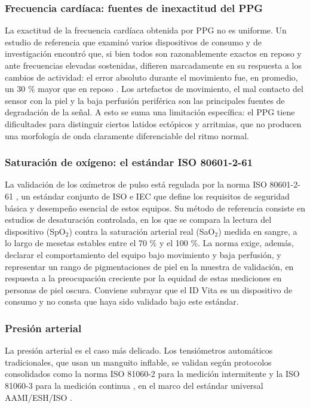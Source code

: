 \subsubsection{Frecuencia cardíaca: fuentes de inexactitud del PPG}
La exactitud de la frecuencia cardíaca obtenida por PPG no es uniforme. Un estudio de referencia que examinó varios dispositivos de consumo y de investigación encontró que, si bien todos son razonablemente exactos en reposo y ante frecuencias elevadas sostenidas, difieren marcadamente en su respuesta a los cambios de actividad: el error absoluto durante el movimiento fue, en promedio, un 30 \% mayor que en reposo \cite{bent2020}. Los artefactos de movimiento, el mal contacto del sensor con la piel y la baja perfusión periférica son las principales fuentes de degradación de la señal. A esto se suma una limitación específica: el PPG tiene dificultades para distinguir ciertos latidos ectópicos y arritmias, que no producen una morfología de onda claramente diferenciable del ritmo normal.\\


\subsubsection{Saturación de oxígeno: el estándar ISO 80601-2-61}
La validación de los oxímetros de pulso está regulada por la norma ISO 80601-2-61 \cite{iso80601}, un estándar conjunto de ISO e IEC que define los requisitos de seguridad básica y desempeño esencial de estos equipos. Su método de referencia consiste en estudios de desaturación controlada, en los que se compara la lectura del dispositivo (SpO$_2$) contra la saturación arterial real (SaO$_2$) medida en sangre, a lo largo de mesetas estables entre el 70 \% y el 100 \%. La norma exige, además, declarar el comportamiento del equipo bajo movimiento y baja perfusión, y representar un rango de pigmentaciones de piel en la muestra de validación, en respuesta a la preocupación creciente por la equidad de estas mediciones en personas de piel oscura. Conviene subrayar que el ID Vita es un dispositivo de consumo y no consta que haya sido validado bajo este estándar.\\


\subsubsection{Presión arterial}
La presión arterial es el caso más delicado. Los tensiómetros automáticos tradicionales, que usan un manguito inflable, se validan según protocolos consolidados como la norma ISO 81060-2 para la medición intermitente \cite{iso81060_2} y la ISO 81060-3 para la medición continua \cite{iso81060_3}, en el marco del estándar universal AAMI/ESH/ISO \cite{stergiou2018}.\\

